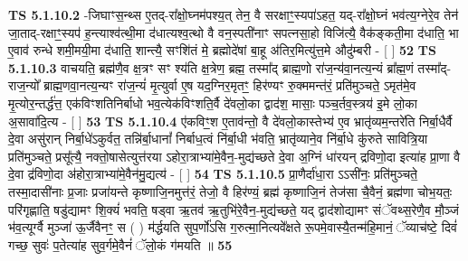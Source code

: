 \documentclass[17pt]{extarticle}
\begin{document}
                  \newline
                                \textbf{ TS 5.1.10.2} \newline
                  -जिघाꣳस॒न्थ्स ए॒तद्-रा᳚क्षो॒घ्नम॑पश्य॒त् तेन॒ वै सरक्षाꣳ॒॒स्यपा॑ऽहत॒ यद्-रा᳚क्षो॒घ्नं भव॑त्य॒ग्नेरे॒व तेन॑ जा॒ताद्-रक्षाꣳ॒॒स्यप॑ ह॒न्त्याश्व॑त्थी॒मा द॑धात्यश्व॒त्थो वै वन॒स्पती॑नाꣳ सपत्नसा॒हो विजि॑त्यै॒ वैक॑ङ्कती॒मा द॑धाति॒ भा ए॒वाव॑ रुन्धे शमी॒मयी॒मा द॑धाति॒ शान्त्यै॒ सꣳशि॑तं मे॒ ब्रह्मोदे॑षां बा॒हू अ॑तिर॒मित्यु॑त्त॒मे औदु॑म्बरी - [  ] \textbf{  52} \newline
                  \newline
                                \textbf{ TS 5.1.10.3} \newline
                  वाचयति॒ ब्रह्म॑णै॒व क्ष॒त्रꣳ सꣳ श्य॑ति क्ष॒त्रेण॒ ब्रह्म॒ तस्मा᳚द् ब्राह्म॒णो रा॑ज॒न्य॑वा॒नत्य॒न्यं ब्रा᳚ह्म॒णं तस्मा᳚द्-राज॒न्यो᳚ ब्राह्म॒णवा॒नत्य॒न्यꣳ रा॑ज॒न्यं॑ मृ॒त्युर्वा ए॒ष यद॒ग्निर॒मृतꣳ॒॒ हिर॑ण्यꣳ रु॒क्ममन्त॑रं॒ प्रति॑मुञ्चते॒ ऽमृत॑मे॒व मृ॒त्योर॒न्तर्द्ध॑त्त॒ एक॑विꣳशतिनिर्बाधो भव॒त्येक॑विꣳशति॒र्वै दे॑वलो॒का द्वाद॑श॒ मासाः॒ पञ्च॒र्तव॒स्त्रय॑ इ॒मे लो॒का अ॒सावा॑दि॒त्य - [  ] \textbf{  53} \newline
                  \newline
                                \textbf{ TS 5.1.10.4} \newline
                  ए॑कविꣳ॒॒श ए॒ताव॑न्तो॒ वै दे॑वलो॒कास्तेभ्य॑ ए॒व भ्रातृ॑व्यम॒न्तरे॑ति निर्बा॒धैर्वै दे॒वा असु॑रान् निर्बा॒धे॑ऽकुर्वत॒ तन्नि॑र्बा॒धानां᳚ निर्बाध॒त्वं नि॑र्बा॒धी भ॑वति॒ भ्रातृ॑व्याने॒व नि॑र्बा॒धे कु॑रुते सावित्रि॒या प्रति॑मुञ्चते॒ प्रसू᳚त्यै॒ नक्तो॒षासेत्युत्त॑रया ऽहोरा॒त्राभ्या॑मे॒वैन॒-मुद्य॑च्छते दे॒वा अ॒ग्निं धा॑रयन् द्रविणो॒दा इत्या॑ह प्रा॒णा वै दे॒वा द्र॑विणो॒दा अ॑होरा॒त्राभ्या॑मे॒वैन॑मु॒द्यत्य॑ - [  ] \textbf{  54} \newline
                  \newline
                                \textbf{ TS 5.1.10.5} \newline
                  प्रा॒णैर्दा॑धा॒रा ऽऽसी॑नः॒ प्रति॑मुञ्चते॒ तस्मा॒दासी॑नाः प्र॒जाः प्रजा॑यन्ते कृष्णाजि॒नमुत्त॑रं॒ तेजो॒ वै हिर॑ण्यं॒ ब्रह्म॑ कृष्णाजि॒नं तेज॑सा चै॒वैनं॒ ब्रह्म॑णा चोभ॒यतः॒ परि॑गृह्णाति॒ षडु॑द्यामꣳ शि॒क्यं॑ भवति॒ षड्वा ऋ॒तव॑ ऋ॒तुभि॑रे॒वैन॒-मुद्य॑च्छते॒ यद् द्वाद॑शोद्यामꣳ संॅवथ्स॒रेणै॒व मौ॒ञ्जं भ॑व॒त्यूर्ग्वै मुञ्जा॑ ऊ॒र्जैवैनꣳ॒॒ स ( ) म॑र्द्धयति सुप॒र्णो॑ऽसि ग॒रुत्मा॒नित्यवे᳚क्षते रू॒पमे॒वास्यै॒तन्म॑हि॒मानं॒ ॅव्याच॑ष्टे॒ दिवं॑ गच्छ॒ सुवः॑ प॒तेत्या॑ह सुव॒र्गमे॒वैनं॑ ॅलो॒कं ग॑मयति ॥ \textbf{  55 } \newline
\end{document}
